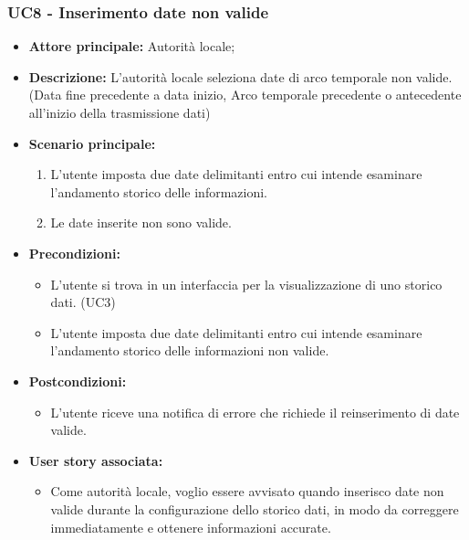 \subsubsection{UC8 - Inserimento date non valide}
\begin{itemize}
    \item \textbf{Attore principale:} Autorità locale;
    \item \textbf{Descrizione:} L’autorità locale seleziona date di arco temporale non valide. (Data fine precedente a data inizio, Arco temporale precedente o antecedente all'inizio della trasmissione dati)
    \item \textbf{Scenario principale:}
          \begin{enumerate}
              \item L'utente imposta due date delimitanti entro cui intende esaminare l'andamento storico delle informazioni.
              \item Le date inserite non sono valide.
          \end{enumerate}
    \item \textbf{Precondizioni:}
          \begin{itemize}
              \item  L'utente si trova in un interfaccia per la visualizzazione di uno storico dati.  (UC3)
              \item L'utente imposta due date delimitanti entro cui intende esaminare l'andamento storico delle informazioni
                    non valide.
          \end{itemize}
    \item \textbf{Postcondizioni:}
          \begin{itemize}
              \item  L'utente riceve una notifica di errore che richiede il reinserimento di date valide.
          \end{itemize}
    \item \textbf{User story associata:}
          \begin{itemize}
              \item Come autorità locale, voglio essere avvisato quando inserisco date non valide durante la configurazione dello storico dati, in modo da correggere immediatamente e ottenere informazioni accurate.
          \end{itemize}
\end{itemize}